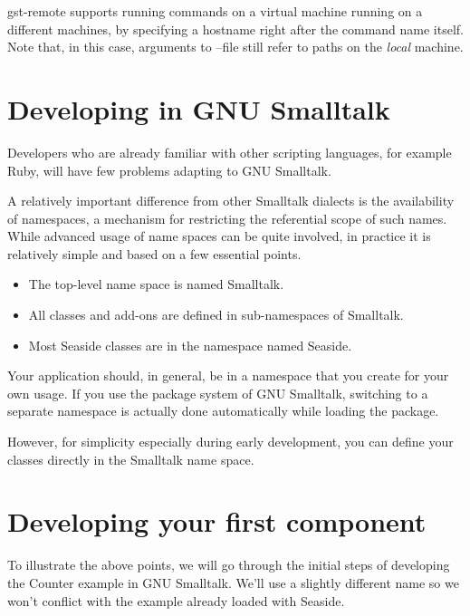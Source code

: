 \documentclass[a4paper,10pt,twoside]{book}
\newcommand{\ct}[1]{{\small\ttfamily\textup{#1}}}
\begin{document}
 \ct{gst-remote} supports running commands on a virtual machine running on a different machines, by specifying a hostname right after the command name itself. Note that, in this case, arguments to \ct{--file} still refer to paths on the \textit{local} machine.

\section{Developing in GNU Smalltalk}
\label{book:gettingstarted:gst:developing}

Developers who are already familiar with other scripting languages, for example Ruby, will have few problems adapting to GNU Smalltalk.

A relatively important difference from other Smalltalk dialects is the availability of namespaces, a mechanism for restricting the referential scope of such names. While advanced usage of name spaces can be quite involved, in practice it is relatively simple and based on a few essential points.

\begin{itemize}
\item  The top-level name space is named Smalltalk. 
\item  All classes and add-ons are defined in sub-namespaces of Smalltalk.
\item  Most Seaside classes are in the namespace named Seaside. 
\end{itemize}

Your application should, in general, be in a namespace that you create for your own usage. If you use the package system of GNU Smalltalk, switching to a separate namespace is actually done automatically while loading the package.

However, for simplicity especially during early development, you can define your classes directly in the Smalltalk name space.

\section{Developing your first component}
\label{book:gettingstarted:gst:firstcomponent}

To illustrate the above points, we will go through the initial steps of developing the Counter example in GNU Smalltalk. We'll use a slightly different name so we won't conflict with the example already loaded with Seaside.
\end{document}
